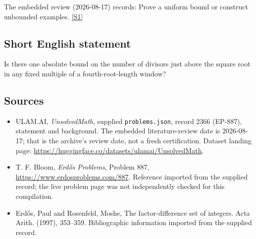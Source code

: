 \documentclass[11pt,a4paper]{article}
\newcommand{\sref}[2]{\hyperlink{source:#1:#2}{[S#2]}}
\begin{document}
The embedded review (2026-08-17) records: Prove a uniform bound or construct unbounded examples. \sref{2366}{1}

\subsection{Short English statement}

Is there one absolute bound on the number of divisors just above the square root in any fixed multiple of a fourth-root-length window?

\subsection{Sources}

{\small

\begin{itemize}

\item[\hypertarget{source:2366:1}{S1}] ULAM.AI, \emph{UnsolvedMath}, supplied \texttt{problems.json}, record 2366 (EP-887), statement and background. The embedded literature-review date is 2026-08-17; that is the archive’s review date, not a fresh certification. Dataset landing page: \url{https://huggingface.co/datasets/ulamai/UnsolvedMath}.

\item[\hypertarget{source:2366:2}{S2}] T. F. Bloom, \emph{Erdős Problems}, Problem 887, \url{https://www.erdosproblems.com/887}. Reference imported from the supplied record; the live problem page was not independently checked for this compilation.

\item[\hypertarget{source:2366:3}{S3}] Erd\H{o}s, Paul and Rosenfeld, Moshe, The factor-difference set of integers. Acta Arith. (1997), 353--359. Bibliographic information imported from the supplied record.

\end{itemize}

}

\label{end:2366}
\end{document}
